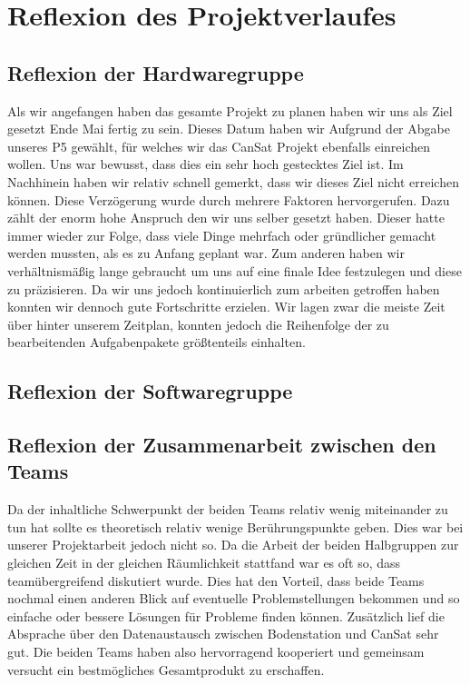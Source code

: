 \section{Reflexion des Projektverlaufes}
\subsection {Reflexion der Hardwaregruppe}
Als wir angefangen haben das gesamte Projekt zu planen haben wir uns als Ziel gesetzt Ende Mai fertig zu sein. Dieses Datum haben wir Aufgrund der Abgabe unseres P5 gewählt, für welches wir das CanSat Projekt ebenfalls einreichen wollen. Uns war bewusst, dass dies ein sehr hoch gestecktes Ziel ist. Im Nachhinein haben wir relativ schnell gemerkt, dass wir dieses Ziel nicht erreichen können. Diese Verzögerung wurde durch mehrere Faktoren hervorgerufen. Dazu zählt der enorm hohe Anspruch den wir uns selber gesetzt haben. Dieser hatte immer wieder zur Folge, dass viele Dinge mehrfach oder gründlicher gemacht werden mussten, als es zu Anfang geplant war. Zum anderen haben wir verhältnismäßig lange gebraucht um uns auf eine finale Idee festzulegen und diese zu präzisieren. Da wir uns jedoch kontinuierlich zum arbeiten getroffen haben konnten wir dennoch gute Fortschritte erzielen. Wir lagen zwar die meiste Zeit über hinter unserem Zeitplan, konnten jedoch die Reihenfolge der zu bearbeitenden Aufgabenpakete größtenteils einhalten.
\subsection {Reflexion der Softwaregruppe}
\subsection {Reflexion der Zusammenarbeit zwischen den Teams}
Da der inhaltliche Schwerpunkt der beiden Teams relativ wenig miteinander zu tun hat sollte es theoretisch relativ wenige Berührungspunkte geben. Dies war bei unserer Projektarbeit jedoch nicht so. Da die Arbeit der beiden Halbgruppen zur gleichen Zeit in der gleichen Räumlichkeit stattfand war es oft so, dass teamübergreifend  diskutiert wurde. Dies hat den Vorteil, dass beide Teams nochmal einen anderen Blick auf eventuelle Problemstellungen bekommen und so einfache oder bessere Lösungen für Probleme finden können. Zusätzlich lief die Absprache über den Datenaustausch zwischen Bodenstation und CanSat sehr gut. Die beiden Teams haben also hervorragend kooperiert und gemeinsam versucht ein bestmögliches Gesamtprodukt zu erschaffen.